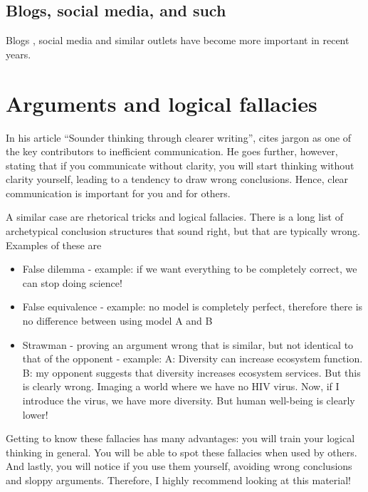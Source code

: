 \documentclass{tufte-book}
\begin{document}
\subsection{Blogs, social media, and such}

Blogs , social media and similar outlets have become more important in recent years. 


\section{Arguments and logical fallacies}

In his article ``Sounder thinking through clearer writing'', \citet{Woodford-Sounderthinkingthrough-1967} cites jargon as one of the key contributors to inefficient communication. He goes further, however, stating that if you communicate without clarity, you will start thinking without clarity yourself, leading to a tendency to draw wrong conclusions. Hence, clear communication is important for you and for others.


A similar case are rhetorical tricks and logical fallacies. There is a long list of archetypical conclusion structures that sound right, but that are typically wrong. Examples of these are

\begin{itemize}
\item False dilemma - example: if we want everything to be completely correct, we can stop doing science!
\item False equivalence - example: no model is completely perfect, therefore there is no difference between using model A and B
\item Strawman - proving an argument wrong that is similar, but not identical to that of the opponent -  example: A: Diversity can increase ecosystem function. B: my opponent suggests that diversity increases ecosystem services. But this is clearly wrong. Imaging a world where we have no HIV virus. Now, if I introduce the virus, we have more diversity. But human well-being is clearly lower!
\end{itemize}

Getting to know these fallacies has many advantages: you will train your logical thinking in general. You will be able to spot these fallacies when used by others. And lastly, you will notice if you use them yourself, avoiding wrong conclusions and sloppy arguments. Therefore, I highly recommend looking at this material!
\end{document}
